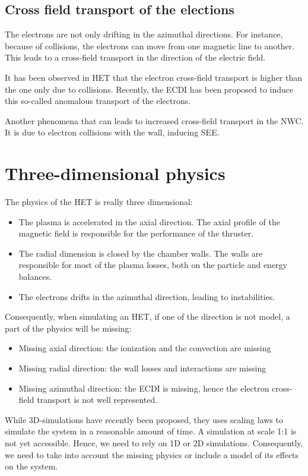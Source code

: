 \subsection{Cross field transport of the elections}
The electrons are not only drifting in the azimuthal directions.
For instance, because of collisions, the electrons can move from one magnetic line to another.
This leads to a cross-field transport in the direction of the electric field.

It has been observed in \ac{HET} that the electron cross-field transport is higher than the one only due to collisions.
Recently, the \ac{ECDI} has been proposed to induce this so-called anomalous transport of the electrons.

Another phenomena that can leads to increased cross-field transport in the \ac{NWC}.
It is due to electron collisions with the wall, inducing \ac{SEE}.


\section{Three-dimensional physics}
\label{sec-3Dphi}

The physics of the \ac{HET} is really three dimensional:

\begin{itemize}
  \item The plasma is accelerated in the axial direction. The axial profile of the magnetic field is responsible for the performance of the thruster.
  \item The radial dimension is closed by the chamber walls. The walls are responsible for most of the plasma losses, both on the particle and energy balances.
  \item The electrons drifts in the azimuthal direction, leading to instabilities.
\end{itemize}

Consequently, when simulating an \ac{HET}, if one of the direction is not model, a part of the physics will be missing:
\begin{itemize}
  \item Missing axial direction: the ionization and the convection are missing
  \item Missing radial direction: the wall losses and interactions are missing
  \item Missing azimuthal direction: the \ac{ECDI} is missing, hence the electron cross-field transport is not well represented.
\end{itemize}

While 3D-simulations have recently been proposed, they uses scaling laws to simulate the system in a reasonable amount of time.
A simulation at scale {1:1} is not yet accessible.
Hence, we need to rely on \ac{1D} or \ac{2D} simulations.
Consequently, we need to take into account the missing physics or include a model of its effects on the system.
